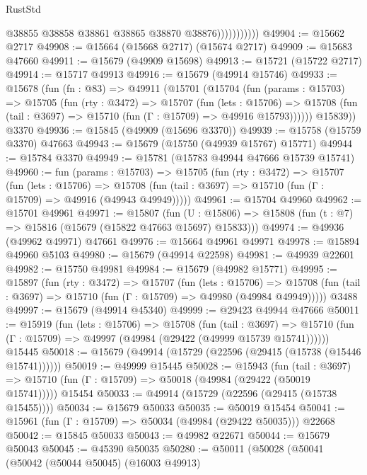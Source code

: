\begin{lexlean}{RustStd}
\begin{coremodule}
                          @38855
                          @38858
                          @38861
                          @38865
                          @38870
                          @38876)))))))))))
@49904 := @15662 @2717
@49908 := @15664 (@15668 @2717) (@15674 @2717)
@49909 := @15683 @47660
@49911 := @15679 (@49909 @15698)
@49913 := @15721 (@15722 @2717)
@49914 := @15717 @49913
@49916 := @15679 (@49914 @15746)
@49933 := @15678
    (fun (fn : @83) =>
    @49911
      (@15701
        (@15704
          (fun (params : @15703) =>
          @15705
            (fun (rty : @3472) =>
            @15707
              (fun (lets : @15706) =>
              @15708 (fun (tail : @3697) => @15710 (fun (Γ : @15709) => @49916 @15793))))))
        @15839))
    @3370
@49936 := @15845 (@49909 (@15696 @3370))
@49939 := @15758 (@15759 @3370) @47663
@49943 := @15679 (@15750 (@49939 @15767) @15771)
@49944 := @15784 @3370
@49949 := @15781 (@15783 @49944 @47666 @15739 @15741)
@49960 := fun (params : @15703) =>
  @15705
    (fun (rty : @3472) =>
    @15707
      (fun (lets : @15706) =>
      @15708 (fun (tail : @3697) => @15710 (fun (Γ : @15709) => @49916 (@49943 @49949)))))
@49961 := @15704 @49960
@49962 := @15701 @49961
@49971 := @15807
    (fun (U : @15806) => @15808 (fun (t : @7) => @15816 (@15679 (@15822 @47663 @15697) @15833)))
@49974 := @49936 (@49962 @49971) @47661
@49976 := @15664 @49961 @49971
@49978 := @15894 @49960 @5103
@49980 := @15679 (@49914 @22598)
@49981 := @49939 @22601
@49982 := @15750 @49981
@49984 := @15679 (@49982 @15771)
@49995 := @15897
    (fun (rty : @3472) =>
    @15707
      (fun (lets : @15706) =>
      @15708 (fun (tail : @3697) => @15710 (fun (Γ : @15709) => @49980 (@49984 @49949)))))
    @3488
@49997 := @15679 (@49914 @45340)
@49999 := @29423 @49944 @47666
@50011 := @15919
    (fun (lets : @15706) =>
    @15708
      (fun (tail : @3697) =>
      @15710 (fun (Γ : @15709) => @49997 (@49984 (@29422 (@49999 @15739 @15741))))))
    @15445
@50018 := @15679 (@49914 (@15729 (@22596 (@29415 (@15738 (@15446 @15741))))))
@50019 := @49999 @15445
@50028 := @15943
    (fun (tail : @3697) => @15710 (fun (Γ : @15709) => @50018 (@49984 (@29422 (@50019 @15741)))))
    @15454
@50033 := @49914 (@15729 (@22596 (@29415 (@15738 @15455))))
@50034 := @15679 @50033
@50035 := @50019 @15454
@50041 := @15961 (fun (Γ : @15709) => @50034 (@49984 (@29422 @50035))) @22668
@50042 := @15845 @50033
@50043 := @49982 @22671
@50044 := @15679 @50043
@50045 := @45390 @50035
@50280 := @50011
    (@50028
      (@50041
        (@50042
          (@50044 @50045)
          (@16003 @49913)

\end{coremodule}
\end{lexlean}

